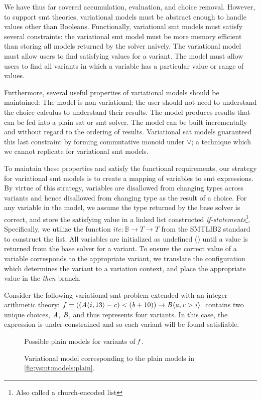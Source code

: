 \label{section:vsmt:models}
We have thus far covered accumulation, evaluation, and choice removal. However,
to support \ac{smt} theories, variational models must be abstract enough to
handle values other than Booleans. Functionally, variational \ac{smt} models
must satisfy several constraints: the variational \ac{smt} model must be more
memory efficient than storing all models returned by the solver naively. The
variational model must allow users to find satisfying values for a variant. The
model must allow users to find all variants in which a variable has a particular
value or range of values.

Furthermore, several useful properties of variational models should be
maintained: The model is non-variational; the user should not need to understand
the choice calculus to understand their results. The model produces results that
can be fed into a plain \ac{sat} or \ac{smt} solver. The model can be built
incrementally and without regard to the ordering of results. Variational
\ac{sat} models guaranteed this last constraint by forming commutative monoid
under $\vee$; a technique which we cannot replicate for variational \ac{smt}
models.

To maintain these properties and satisfy the functional requirements, our
strategy for variational \ac{smt} models is to create a mapping of variables to
\ac{smt} expressions. By virtue of this strategy, variables are disallowed from
changing types across variants and hence disallowed from changing type as the
result of a choice. For any variable in the model, we assume the type returned
by the base solver is correct, and store the satisfying value in a linked list
constructed \emph{if-statements}\footnote{Also called a church-encoded list}.
Specifically, we utilize the function $ite : \mathbb{B} \rightarrow T
\rightarrow T$ from the SMTLIB2 standard to construct the list. All variables
are initialized as undefined (\undefined) until a value is returned from the
base solver for a variant. To ensure the correct value of a variable corresponds
to the appropriate variant, we translate the configuration which determines the
variant to a variation context, and place the appropriate value in the
\emph{then} branch.

Consider the following variational \ac{smt} problem extended with an integer
arithmetic theory: $f = ((\chc[A]{\iV{}, 13} - \cV{}) < (\bV + 10)) \rightarrow
\chc[B]{\aV{}, \cV{} > \iV{}}$. \fV{} contains two unique choices, $\mathit{A}$,
$\mathit{B}$, and thus represents four variants. In this case, the expression is
under-constrained and so each variant will be found satisfiable.
%
\begin{figure}[h]
  \centering
  
  \caption{Possible plain models for variants of $\mathit{f}$.}%
  \label{fig:vsmt:models:plain}
\end{figure}
\begin{figure}[h]
  \centering
  
  \caption{Variational model corresponding to the plain models in
    \autoref{fig:vsmt:models:plain}.}%
  \label{fig:vsmt:models:var}
\end{figure}


